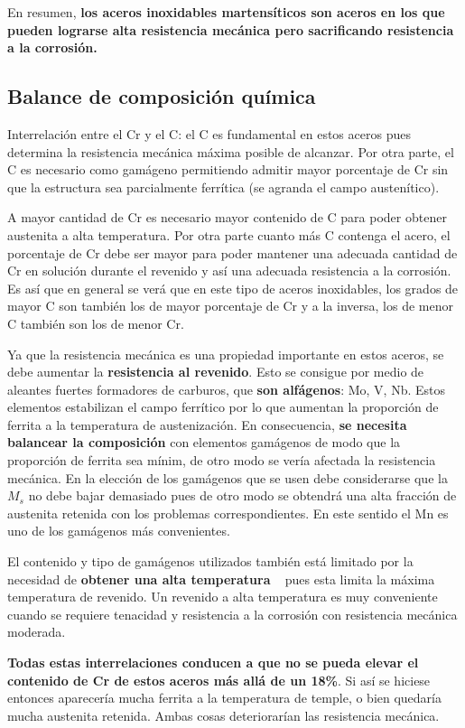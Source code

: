 En resumen, \textbf{los aceros inoxidables martensíticos son aceros en los que pueden lograrse alta resistencia mecánica pero sacrificando resistencia a la corrosión.}

\subsection{Balance de composición química}
Interrelación entre el Cr y el C: el C es fundamental en estos aceros pues determina la resistencia mecánica máxima posible de alcanzar. Por otra parte, el C es necesario como gamágeno permitiendo admitir mayor porcentaje de Cr sin que la estructura sea parcialmente ferrítica (se agranda el campo austenítico). 

A mayor cantidad de Cr es necesario mayor contenido de C para poder obtener austenita a alta temperatura. Por otra parte cuanto más C contenga el acero, el porcentaje de Cr debe ser mayor para poder mantener una adecuada cantidad de Cr en solución durante el revenido y así una adecuada resistencia a la corrosión. Es así que en general se verá que en este tipo de aceros inoxidables, los grados de mayor C son también los de mayor porcentaje de Cr y a la inversa, los de menor C también son los de menor Cr.

Ya que la resistencia mecánica es una propiedad importante en estos aceros, se debe aumentar la \textbf{resistencia al revenido}. Esto se consigue por medio de aleantes fuertes formadores de carburos, que \textbf{son alfágenos}: Mo, V, Nb. Estos elementos estabilizan el campo ferrítico por lo que aumentan la proporción de ferrita a la temperatura de austenización. En consecuencia, \textbf{se necesita balancear la composición} con elementos gamágenos de modo que la proporción de ferrita sea mínim, de otro modo se vería afectada la resistencia mecánica. En la elección de los gamágenos que se usen debe considerarse que la $M_s$ no debe bajar demasiado pues de otro modo se obtendrá una alta fracción de austenita retenida con los problemas correspondientes. En este sentido el Mn es uno de los gamágenos más convenientes.

El contenido y tipo de gamágenos utilizados también está limitado por la necesidad de \textbf{obtener una alta temperatura} \Aone~ pues esta limita la máxima temperatura de revenido. Un revenido a alta temperatura es muy conveniente cuando se requiere tenacidad y resistencia a la corrosión con resistencia mecánica moderada.

\textbf{Todas estas interrelaciones conducen a que no se pueda elevar el contenido de Cr de estos aceros más allá de un 18\%}. Si así se hiciese entonces aparecería mucha ferrita a la temperatura de temple, o bien quedaría mucha austenita retenida. Ambas cosas deteriorarían las resistencia mecánica.


